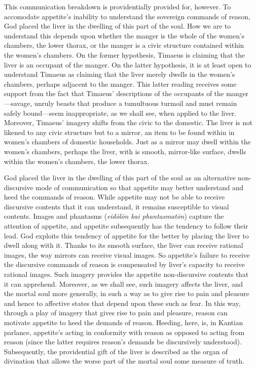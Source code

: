 This communication breakdown is providentially provided for, however. To accomodate appetite's inability to understand the sovereign commands of reason, God placed the liver in the dwelling of this part of the soul. How we are to understand this depends upon whether the manger is the whole of the women's chambers, the lower thorax, or the manger is a civic structure contained within the women's chambers. On the former hypothesis, Timaeus is claiming that the liver is an occupant of the manger. On the latter hypothesis, it is at least open to understand Timaeus as claiming that the liver merely dwells in the women's chambers, perhaps adjacent to the manger. This latter reading receives some support from the fact that Timaeus' descriptions of the occupants of the manger---savage, unruly beasts that produce a tumultuous turmoil and must remain safely bound---seem inappropriate, as we shall see, when applied to the liver. Moreover, Timaeus' imagery shifts from the civic to the domestic. The liver is not likened to any civic structure but to a mirror, an item to be found within in women's chambers of domestic households. Just as a mirror may dwell within the women's chambers, perhaps the liver, with is smooth, mirror-like surface, dwells within the women's chambers, the lower thorax.

God placed the liver in the dwelling of this part of the soul as an alternative non-discursive mode of communication so that appetite may better understand and heed the commands of reason. While appetite may not be able to receive discursive contents that it can understand, it remains susceptible to visual contents. Images and phantasms (\emph{eidōlōn kai phantasmatōn}) capture the attention of appetite, and appetite subsequently has the tendency to follow their lead. God exploits this tendency of appetite for the better by placing the liver to dwell along with it. Thanks to its smooth surface, the liver can receive rational images, the way mirrors can receive visual images. So appetite's failure to receive the discursive commands of reason is compensated by liver's capacity to receive rational images. Such imagery provides the appetite non-discursive contents that it can apprehend. Moreover, as we shall see, such imagery affects the liver, and the mortal soul more generally, in such a way as to give rise to pain and pleasure and hence to affective states that depend upon these such as fear. In this way, through a play of imagery that gives rise to pain and pleasure, reason can motivate appetite to heed the demands of reason. Heeding, here, is, in Kantian parlance, appetite's acting in conformity with reason as opposed to acting from reason (since the latter requires reason's demands be discursively understood). Subsequently, the providential gift of the liver is described as the organ of divination that allows the worse part of the mortal soul some measure of truth. 

